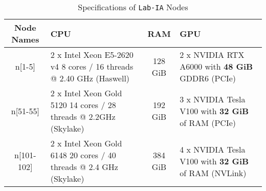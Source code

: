 
\begin{table}%
    \centering
    \begin{tabular}{|c|p{}|c|p{}|}
        \hline
        \textbf{Node Names} & \textbf{CPU} & \textbf{RAM} & \textbf{GPU} \\ \hline
        n[1-5] & 2 x Intel Xeon E5-2620 v4 8 cores / 16 threads @ 2.40 GHz (Haswell) & 128 GiB & 2 x NVIDIA RTX A6000 with \textbf{48 GiB} GDDR6 (PCIe) \\ \hline
        n[51-55] & 2 x Intel Xeon Gold 5120 14 cores / 28 threads @ 2.2GHz (Skylake) & 192 GiB & 3 x NVIDIA Tesla V100 with \textbf{32 GiB} of RAM (PCIe) \\ \hline
        n[101-102] & 2 x Intel Xeon Gold 6148 20 cores / 40 threads @ 2.4 GHz (Skylake) & 384 GiB & 4 x NVIDIA Tesla V100 with \textbf{32 GiB} of RAM (NVLink) \\ \hline
    \end{tabular}
    \caption{Specifications of \texttt{Lab-IA} Nodes }
    \label{tab:06_labia_specs}
\end{table}